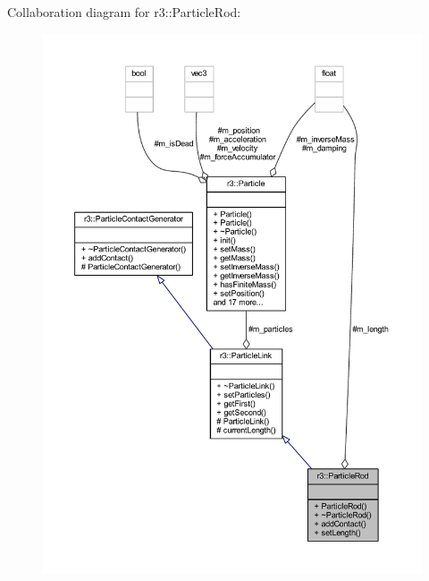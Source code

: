 Collaboration diagram for r3\+:\+:Particle\+Rod\+:\nopagebreak
\begin{figure}[H]
\begin{center}
\leavevmode
\includegraphics[width=350pt]{classr3_1_1_particle_rod__coll__graph}
\end{center}
\end{figure}
